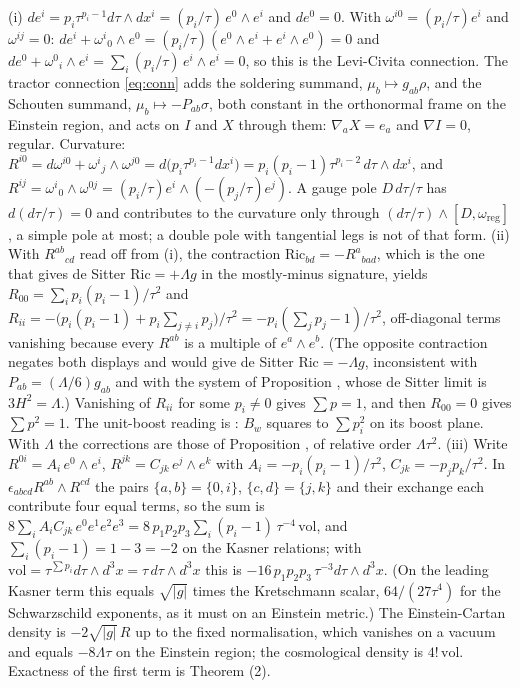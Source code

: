 (i) $de^i = p_i\tau^{p_i-1}d\tau\wedge dx^i = (p_i/\tau)\,e^0\wedge e^i$ and $de^0 = 0$. With $\omega^{i0} = (p_i/\tau)e^i$ and $\omega^{ij} = 0$: $de^i + \omega^{i}{}_{0}\wedge e^0 = (p_i/\tau)(e^0\wedge e^i + e^i\wedge e^0) = 0$ and $de^0 + \omega^{0}{}_{i}\wedge e^i = \sum_i (p_i/\tau)\, e^i\wedge e^i = 0$, so this is the Levi-Civita connection. The tractor connection \eqref{eq:conn} adds the soldering summand, $\mu_b \mapsto g_{ab}\rho$, and the Schouten summand, $\mu_b \mapsto -P_{ab}\sigma$, both constant in the orthonormal frame on the Einstein region, and acts on $I$ and $X$ through them: $\nabla_a X = e_a$ and $\nabla I = 0$, regular. Curvature: $R^{i0} = d\omega^{i0} + \omega^{i}{}_{j}\wedge\omega^{j0} = d\bigl(p_i\tau^{p_i-1}dx^i\bigr) = p_i(p_i-1)\tau^{p_i-2}\,d\tau\wedge dx^i$, and $R^{ij} = \omega^{i}{}_{0}\wedge\omega^{0j} = (p_i/\tau)e^i\wedge(-(p_j/\tau)e^j)$. A gauge pole $D\,d\tau/\tau$ has $d(d\tau/\tau) = 0$ and contributes to the curvature only through $(d\tau/\tau)\wedge[D, \omega_{\mathrm{reg}}]$, a simple pole at most; a double pole with tangential legs is not of that form. (ii) With $R^{ab}{}_{cd}$ read off from (i), the contraction $\mathrm{Ric}_{bd} = -R^{a}{}_{bad}$, which is the one that gives de Sitter $\mathrm{Ric} = +\Lambda g$ in the mostly-minus signature, yields $R_{00} = \sum_i p_i(p_i-1)/\tau^2$ and $R_{ii} = -\bigl(p_i(p_i-1) + p_i\sum_{j\neq i}p_j\bigr)/\tau^2 = -p_i(\sum_j p_j - 1)/\tau^2$, off-diagonal terms vanishing because every $R^{ab}$ is a multiple of $e^a\wedge e^b$. (The opposite contraction negates both displays and would give de Sitter $\mathrm{Ric} = -\Lambda g$, inconsistent with $P_{ab} = (\Lambda/6)g_{ab}$ and with the system of Proposition , whose de Sitter limit is $3H^2 = \Lambda$.) Vanishing of $R_{ii}$ for some $p_i \neq 0$ gives $\sum p = 1$, and then $R_{00} = 0$ gives $\sum p^2 = 1$. The unit-boost reading is \cite[Prop.~8.26(3)]{ButlerT4}: $B_w$ squares to $\sum p_i^2$ on its boost plane. With $\Lambda$ the corrections are those of Proposition , of relative order $\Lambda\tau^2$. (iii) Write $R^{0i} = A_i\,e^0\wedge e^i$, $R^{jk} = C_{jk}\,e^j\wedge e^k$ with $A_i = -p_i(p_i-1)/\tau^2$, $C_{jk} = -p_jp_k/\tau^2$. In $\epsilon_{abcd}R^{ab}\wedge R^{cd}$ the pairs $\{a,b\} = \{0,i\}$, $\{c,d\} = \{j,k\}$ and their exchange each contribute four equal terms, so the sum is $8\sum_i A_iC_{jk}\,e^0e^1e^2e^3 = 8\,p_1p_2p_3\sum_i(p_i - 1)\,\tau^{-4}\,\mathrm{vol}$, and $\sum_i(p_i - 1) = 1 - 3 = -2$ on the Kasner relations; with $\mathrm{vol} = \tau^{\sum p_i}d\tau\wedge d^3x = \tau\,d\tau\wedge d^3x$ this is $-16\,p_1p_2p_3\,\tau^{-3}d\tau\wedge d^3x$. (On the leading Kasner term this equals $\sqrt{|g|}$ times the Kretschmann scalar, $64/(27\tau^4)$ for the Schwarzschild exponents, as it must on an Einstein metric.) The Einstein-Cartan density is $-2\sqrt{|g|}\,R$ up to the fixed normalisation, which vanishes on a vacuum and equals $-8\Lambda\tau$ on the Einstein region; the cosmological density is $4!\,\mathrm{vol}$. Exactness of the first term is Theorem (2).
